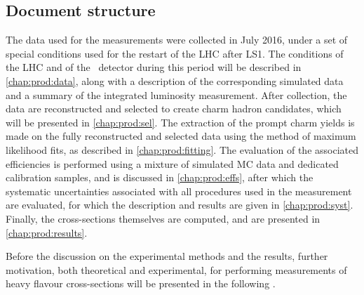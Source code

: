 \subsection{Document structure}
\label{chap:prod:introduction:structure}

The data used for the measurements were collected in July 2016, under a set of 
special conditions used for the restart of the \ac{LHC} after \ac{LS1}.
The conditions of the \ac{LHC} and of the \lhcb\ detector during this period 
will be described in \cref{chap:prod:data}, along with a description of the 
corresponding simulated data and a summary of the integrated luminosity 
measurement.
After collection, the data are reconstructed and selected to create charm 
hadron candidates, which will be presented in \cref{chap:prod:sel}.
The extraction of the prompt charm yields is made on the fully reconstructed 
and selected data using the method of maximum likelihood fits, as described in 
\cref{chap:prod:fitting}.
The evaluation of the associated efficiencies is performed using a mixture of 
simulated \acl{MC} data and dedicated calibration samples, and is discussed in 
\cref{chap:prod:effs}, after which the systematic uncertainties associated with 
all procedures used in the measurement are evaluated, for which the description 
and results are given in \cref{chap:prod:syst}.
Finally, the cross-sections themselves are computed, and are presented in 
\cref{chap:prod:results}.

Before the discussion on the experimental methods and the results, further 
motivation, both theoretical and experimental, for performing measurements of 
heavy flavour cross-sections will be presented in the following 
.
